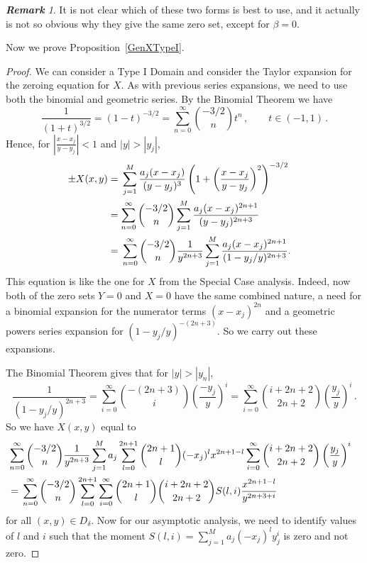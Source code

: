 \documentclass{article}
\theoremstyle{remark}
\newtheorem{rem}[thm]{\bf Remark}
\numberwithin{equation}{section}
\begin{document}
\begin{rem} It is not clear which of these two forms is best to use, and it actually is not so obvious why they give the same zero set, except for $\beta = 0$.
\end{rem}

\rm Now we prove Proposition~\ref{GenXTypeI}.

\begin{proof}
We can consider a Type I Domain and consider the Taylor expansion for the zeroing equation for $X$. 
As with previous series expansions, we need to use both the binomial and geometric series. By the Binomial Theorem we have 
$$\frac 1{(1+t)^{3/2}} = (1-t)^{-3/2} = \sum_{n=0}^\infty \binom{-3/2}{n} t^n\,, \qquad t \in (-1,1)\,.$$
Hence, for $\displaystyle{\left| \frac{x-x_j}{y-y_j} \right| < 1}$ and $|y| > |y_j|$,
\begin{equation} \notag \begin{split}
\pm X(x,y) & = \, \sum_{j=1}^M{\frac{a_j(x-x_j)}{(y-y_j)^3} \left( 1 + \left( \displaystyle{ \frac{x-x_j}{y-y_j}} \right)^2 \right)^{-3/2}} \cr
& = \sum_{n=0}^\infty{\binom{-3/2}{n} \sum_{j=1}^M{\frac{a_j(x-x_j)^{2n+1}}{(y-y_j)^{2n+3}}}} \cr 
& = \, \sum_{n=0}^\infty{\binom{-3/2}{n} \frac{1}{y^{2n+3}} \sum_{j=1}^M{\frac{a_j(x-x_j)^{2n+1}}{(1-y_j/y)^{2n+3}}}}. \cr
\end{split} \end{equation}
This equation is like the one for $X$ from the Special Case analysis.  Indeed, now both of the zero sets $Y=0$ and $X=0$ have the same combined nature,
a need for a binomial expansion for the numerator terms $(x-x_j)^{2n}$ and a geometric powers series expansion for $(1-y_j/y)^{-(2n+3)}$.
So we carry out these expansions.

The Binomial Theorem gives that for $|y| > |y_n|$,
$$\frac{1}{(1-y_j/y)^{2n+3}} = \sum_{i=0}^\infty{\binom{-(2n+3)}{i}\left( \frac{-y_j}{y} \right)^i} = 
\sum_{i=0}^\infty \binom{i+2n+2}{2n+2}\left (\frac {y_j}y\right )^i\, .$$
So we have $X(x,y)$ equal to
\begin{equation} \label{GenF1} \begin{split}
& \sum_{n=0}^\infty{\binom{-3/2}{n} \frac{1}{y^{2n+3}} \sum_{j=1}^M{a_j\sum_{l=0}^{2n+1}\binom{2n+1}{l}(-x_j)^lx^{2n+1-l}\sum_{i=0}^\infty \binom{i+2n+2}{2n+2}\left (\frac {y_j}y\right )^i}} \cr
& = \, \sum_{n=0}^\infty{\binom{-3/2}{n} \sum_{l=0}^{2n+1}\sum_{i=0}^\infty \binom{2n+1}l \binom{i+2n+2}{2n+2} S(l,i) \frac {x^{2n+1-l}}{y^{2n+3 +i}}} \cr 
\end{split} \end{equation}
for all $(x,y) \in D_\delta$. Now for our asymptotic analysis, we need to identify values of $l$ and $i$ such that the moment $S(l,i) = \sum_{j=1}^M a_j(-x_j)^ly_j^i$ is zero and not zero.


\end{proof}
\end{document}

